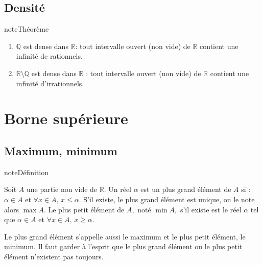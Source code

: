 \documentclass[letterpaper,10pt,french]{jupyterBook}
\begin{document}
\subsection{Densité}
\label{\detokenize{proprties:densite}}
\begin{sphinxadmonition}{note}{Théorème}
\begin{enumerate}
%
\item {} 
\sphinxAtStartPar
\(\mathbb{Q}\) est dense dans \(\mathbb{R}\): tout intervalle ouvert (non vide) de \(\mathbb{R}\) contient une infinité de rationnels.

\item {} 
\sphinxAtStartPar
\(\mathbb{R}\setminus \mathbb{Q}\) est dense dans \(\mathbb{R}\) : tout intervalle ouvert (non vide) de \(\mathbb{R}\) contient une infinité d’irrationnels.

\end{enumerate}
\end{sphinxadmonition}


\section{Borne supérieure}
\label{\detokenize{proprties:borne-superieure}}

\subsection{Maximum, minimum}
\label{\detokenize{proprties:maximum-minimum}}
\begin{sphinxadmonition}{note}{Définition}

\sphinxAtStartPar
Soit \(A\) une partie non vide de \(\mathbb{R}.\) Un réel \(\alpha\) est un plus grand élément de \(A\) si :
\(\alpha\in A\) et \(\forall x\in A,\,x\leqslant \alpha.\)
S’il existe, le plus grand élément est unique, on le note alors \(\max A.\)
Le plus petit élément de \(A,\) noté \(\min A,\) s’il existe est le réel \(\alpha\) tel que \(\alpha\in A\) et \(\forall x\in A, \,x\geqslant \alpha.\)

\sphinxAtStartPar
Le plus grand élément s’appelle aussi le maximum et le plus petit élément, le minimum. Il faut garder à l’esprit que
le plus grand élément ou le plus petit élément n’existent pas toujours.
\end{sphinxadmonition}
\end{document}
